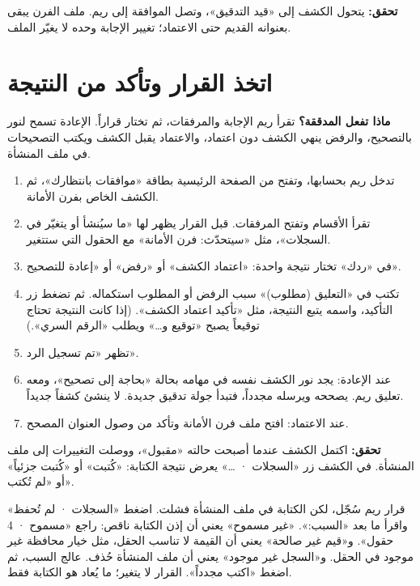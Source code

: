 \textbf{تحقق:} يتحول الكشف إلى «قيد التدقيق»، وتصل الموافقة إلى ريم. ملف الفرن يبقى بعنوانه القديم حتى الاعتماد؛ تغيير الإجابة وحده لا يغيّر الملف.

\section{اتخذ القرار وتأكد من النتيجة}
\label{sec:build-decision}

\textbf{ماذا تفعل المدققة؟} تقرأ ريم الإجابة والمرفقات، ثم تختار قراراً. الإعادة تسمح لنور بالتصحيح، والرفض ينهي الكشف دون اعتماد، والاعتماد يقبل الكشف ويكتب التصحيحات في ملف المنشأة.

\begin{enumerate}
\item تدخل ريم بحسابها، وتفتح من الصفحة الرئيسية بطاقة «موافقات بانتظارك»، ثم الكشف الخاص بفرن الأمانة.
\item تقرأ الأقسام وتفتح المرفقات. قبل القرار يظهر لها «ما سيُنشأ أو يتغيّر في السجلات»، مثل «سيتحدّث: فرن الأمانة» مع الحقول التي ستتغير.
\item في «ردك» تختار نتيجة واحدة: «اعتماد الكشف» أو «رفض» أو «إعادة للتصحيح».
\item تكتب في «التعليق (مطلوب)» سبب الرفض أو المطلوب استكماله. ثم تضغط زر التأكيد، واسمه يتبع النتيجة، مثل «تأكيد اعتماد الكشف». (إذا كانت النتيجة تحتاج توقيعاً يصبح «توقيع و…» ويطلب «الرقم السري».)
\item تظهر «تم تسجيل الرد».
\item عند الإعادة: يجد نور الكشف نفسه في مهامه بحالة «بحاجة إلى تصحيح»، ومعه تعليق ريم. يصححه ويرسله مجدداً، فتبدأ جولة تدقيق جديدة. لا ينشئ كشفاً جديداً.
\item عند الاعتماد: افتح ملف فرن الأمانة وتأكد من وصول العنوان المصحح.
\end{enumerate}

\textbf{تحقق:} اكتمل الكشف عندما أصبحت حالته «مقبول»، ووصلت التغييرات إلى ملف المنشأة. في الكشف زر «السجلات · …» يعرض نتيجة الكتابة: «كُتبت» أو «كُتبت جزئياً» أو «لم تُكتب».

\begin{rcwarn}
قرار ريم سُجّل، لكن الكتابة في ملف المنشأة فشلت. اضغط «السجلات · لم تُحفظ» واقرأ ما بعد «السبب:». «غير مسموح» يعني أن إذن الكتابة ناقص: راجع «مسموح · 4 حقول». و«قيم غير صالحة» يعني أن القيمة لا تناسب الحقل، مثل خيار محافظة غير موجود في الحقل. و«السجل غير موجود» يعني أن ملف المنشأة حُذف. عالج السبب، ثم اضغط «اكتب مجدداً». القرار لا يتغير؛ ما يُعاد هو الكتابة فقط.
\end{rcwarn}

